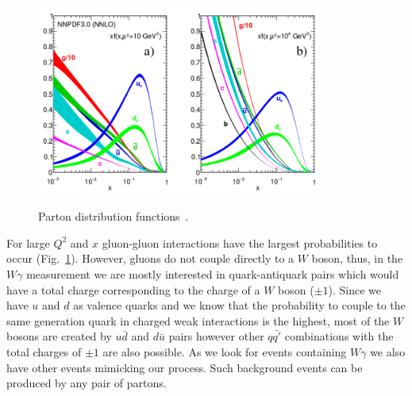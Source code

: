 \begin{figure}[htb]
  \begin{center}
    {\includegraphics[width=0.85\textwidth]{../figs/Intro/pdfs.png}}
    \caption{Parton distribution functions~\cite{ref_PDG}.}
    \label{fig:pdfs}
  \end{center}
\end{figure}

For large $Q^2$ and $x$ gluon-gluon interactions have the largest probabilities to occur (Fig.~\ref{fig:pdfs}). However, gluons do not couple directly to a $W$ boson, thus, in the $W\gamma$ measurement we are mostly interested in quark-antiquark pairs which would have a total charge corresponding to the charge of a $W$ boson ($\pm 1$). Since we have $u$ and $d$ as valence quarks and we know that the probability to couple to the same generation quark in charged weak interactions is the highest, most of the $W$ bosons are created by $u\bar{d}$ and $d\bar{u}$ pairs however other $q\bar{q'}$ combinations with the total charges of $\pm 1$ are also possible. As we look for events containing $W\gamma$ we also have other events mimicking our process. Such background events can be produced by any pair of partons.



